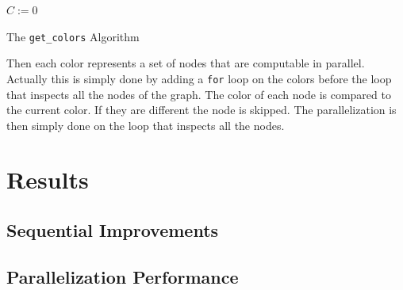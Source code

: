 \documentclass[fleqn,11pt]{SelfArx} %
\theoremstyle{definition}
\begin{document}
\begin{algorithm}[h]
\SetAlgoLined
{}

\BlankLine

$C := 0$\;

\caption{The \texttt{get\_colors} Algorithm}
\label{getcolors}
\end{algorithm}

Then each color represents a set of nodes that are computable in parallel. Actually this is simply done by adding a \verb+for+ loop on the colors before the loop that inspects all the nodes of the graph. The color of each node is compared to the current color. If they are different the node is skipped. The parallelization is then simply done on the loop that inspects all the nodes.


\section{Results}

\subsection{Sequential Improvements}

\subsection{Parallelization Performance}
\end{document}
